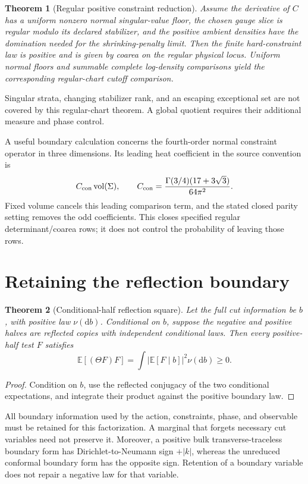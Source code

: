 \documentclass[11pt,a4paper,oneside]{book}
\theoremstyle{plain}
\newtheorem{theorem}{Theorem}[chapter]
\theoremstyle{definition}
\theoremstyle{remark}
\newcommand{\E}{\mathbb E}
\newcommand{\dd}{\mathrm d}
\newcommand{\vol}{\operatorname{vol}}
\newcommand{\src}[2]{\cite{#1}}
\begin{document}
\begin{theorem}[Regular positive constraint reduction]
\label{thm:coarea}
Assume the derivative of $C$ has a uniform nonzero normal singular-value floor, the chosen gauge slice is regular modulo its declared stabilizer, and the positive ambient densities have the domination needed for the shrinking-penalty limit. Then the finite hard-constraint law is positive and is given by coarea on the regular physical locus. Uniform normal floors and summable complete log-density comparisons yield the corresponding regular-chart cutoff comparison.
\end{theorem}
\src{R8}{thm:e8v58-coarea,thm:e8v83-second-coarea,thm:e8v99-coarea-ratio}
Singular strata, changing stabilizer rank, and an escaping exceptional set are not covered by this regular-chart theorem. A global quotient requires their additional measure and phase control.

A useful boundary calculation concerns the fourth-order normal constraint operator in three dimensions. Its leading heat coefficient in the source convention is
\begin{equation}
 C_{\rm con}\vol(\Sigma),\qquad
 C_{\rm con}=\frac{\Gamma(3/4)(17+3\sqrt3)}{64\pi^2}.
 \label{eq:coarea-heat}
\end{equation}
Fixed volume cancels this leading comparison term, and the stated closed parity setting removes the odd coefficients. This closes specified regular determinant/coarea rows; it does not control the probability of leaving those rows. \cite{R8}

\section{Retaining the reflection boundary}
\begin{theorem}[Conditional-half reflection square]
\label{thm:half-square}
Let the full cut information be $b$, with positive law $\nu(\dd b)$. Conditional on $b$, suppose the negative and positive halves are reflected copies with independent conditional laws. Then every positive-half test $F$ satisfies
\begin{equation}
 \E[(\Theta F)F]
 =\int\left|\E[F\mid b]\right|^2\nu(\dd b)\ge0.
 \label{eq:half-square}
\end{equation}
\end{theorem}
\begin{proof}
Condition on $b$, use the reflected conjugacy of the two conditional expectations, and integrate their product against the positive boundary law.
\end{proof}
\cite{R10,R14}
All boundary information used by the action, constraints, phase, and observable must be retained for this factorization. A marginal that forgets necessary cut variables need not preserve it. Moreover, a positive bulk transverse-traceless boundary form has Dirichlet-to-Neumann sign $+|k|$, whereas the unreduced conformal boundary form has the opposite sign. Retention of a boundary variable does not repair a negative law for that variable. \src{R9}{thm:n9v97-Einstein-boundary-symbol}
\end{document}
